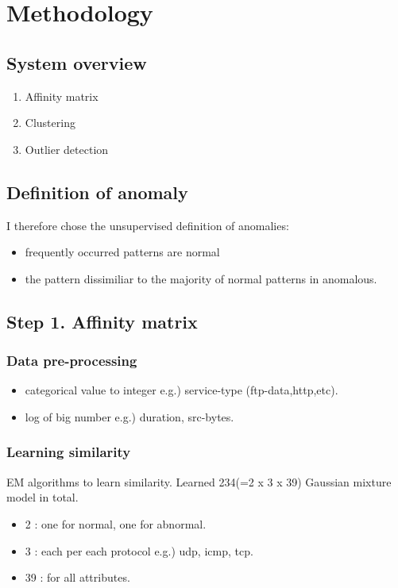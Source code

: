\section{Methodology}
\subsection{System overview}
\begin{enumerate}
\item Affinity matrix
\item Clustering
\item Outlier detection
\end{enumerate}

\subsection{Definition of anomaly}
I therefore chose the unsupervised definition of anomalies:
\begin{itemize}
\item frequently occurred patterns are normal
\item the pattern dissimiliar to the majority of normal patterns in anomalous.
\end{itemize}

\subsection{Step 1. Affinity matrix}
\subsubsection{Data pre-processing}
\begin{itemize}
\item categorical value to integer e.g.) service-type (ftp-data,http,etc).
\item log of big number e.g.) duration, src-bytes.
\end{itemize}

\subsubsection{Learning similarity}
EM algorithms to learn similarity. Learned 234(=2 x 3 x 39) Gaussian mixture model in total.
\begin{itemize}
\item 2 : one for normal, one for abnormal.
\item 3 : each per each protocol e.g.) udp, icmp, tcp.
\item 39 : for all attributes.
\end{itemize}

